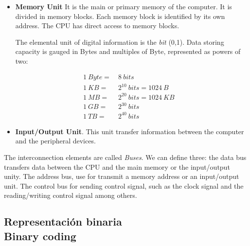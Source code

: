 \begin{paracol}{2}
\begin{itemize}
\item \textbf{Memory Unit} It is the main or primary memory of the computer. It is divided in memory blocks. Each memory block is identified by its own address. The CPU has direct access to memory blocks.

The elemental unit of digital information is the \emph{bit} (0,1). Data storing capacity is gauged in Bytes  and multiples of Byte, represented as powers of two:

\begin{align} \nonumber
1\  Byte = &\ 8\ bits\ &\  \\ \nonumber
1\  KB  = &\ 2^{10}\ bits=1024\ B&\ \\  \nonumber
1\  MB = &\ 2^{20}\ bits=1024\ KB&\ \\  \nonumber
1\  GB = &\ 2^{30}\ bits &\ \\  \nonumber
1\  TB  = &\ 2^{40}\ bits\ &\
\end{align} 

\item \textbf{Input/Output Unit}. This unit transfer information between the computer and the peripheral devices.
\end{itemize}

The interconnection elements are called \emph{Buses}. We can define three: the data bus transfers data between the CPU and the main memory or the input/output unity. The address bus, use for transmit  a memory address or an  input/output unit. The control bus for sending control signal, such as the clock signal and the reading/writing control signal among others.     
\end{paracol} 

\subsection{Representación binaria\\ Binary coding} 

